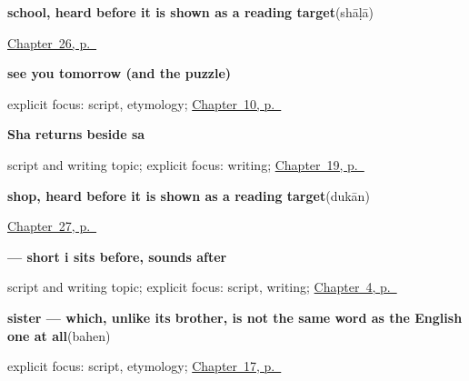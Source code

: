 \noindent\begin{minipage}[t]{\linewidth}
\raggedright
\textbf{school, heard before it is shown as a reading target}\enspace\emph{}\enspace(shāḷā)\par
\footnotesize \hyperref[ch:gu-city-school-road]{Chapter~26, p.~\pageref*{ch:gu-city-school-road}}
\end{minipage}\par\smallskip

\noindent\begin{minipage}[t]{\linewidth}
\raggedright
\textbf{see you tomorrow (and the  puzzle)}\enspace\emph{ }\par
\footnotesize explicit focus: script, etymology; \hyperref[ch:farewells]{Chapter~10, p.~\pageref*{ch:farewells}}
\end{minipage}\par\smallskip

\noindent\begin{minipage}[t]{\linewidth}
\raggedright
\textbf{Sha returns beside sa}\par
\footnotesize script and writing topic; explicit focus: writing; \hyperref[ch:gu-r4-script-names]{Chapter~19, p.~\pageref*{ch:gu-r4-script-names}}
\end{minipage}\par\smallskip

\noindent\begin{minipage}[t]{\linewidth}
\raggedright
\textbf{shop, heard before it is shown as a reading target}\enspace\emph{}\enspace(dukān)\par
\footnotesize \hyperref[ch:gu-village-shop-ten]{Chapter~27, p.~\pageref*{ch:gu-village-shop-ten}}
\end{minipage}\par\smallskip

\noindent\begin{minipage}[t]{\linewidth}
\raggedright
\textbf{ — short i sits before, sounds after}\par
\footnotesize script and writing topic; explicit focus: script, writing; \hyperref[ch:gu-first-use-forms-a]{Chapter~4, p.~\pageref*{ch:gu-first-use-forms-a}}
\end{minipage}\par\smallskip

\noindent\begin{minipage}[t]{\linewidth}
\raggedright
\textbf{sister — which, unlike its brother, is not the same word as the English one at all}\enspace\emph{}\enspace(bahen)\par
\footnotesize explicit focus: script, etymology; \hyperref[ch:gu-friend-and-family]{Chapter~17, p.~\pageref*{ch:gu-friend-and-family}}
\end{minipage}\par\smallskip

